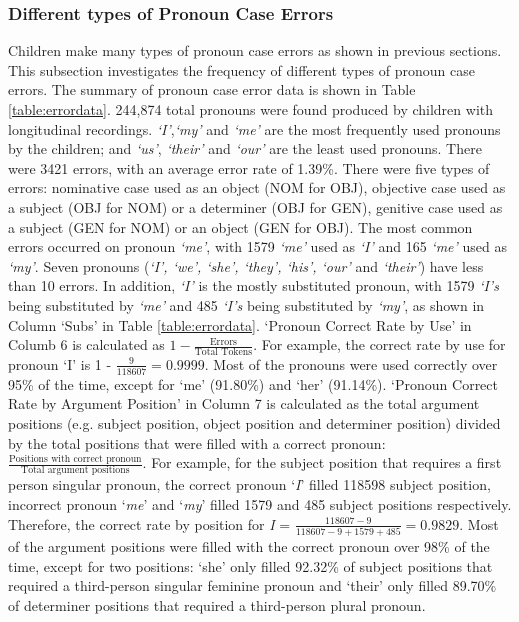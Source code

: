 \subsubsection{Different types of Pronoun Case Errors}
Children make many types of pronoun case errors as shown in previous sections. This subsection investigates the frequency of different types of pronoun case errors. The summary of pronoun case error data is shown in Table \ref{table:errordata}. 244,874 total pronouns were found produced by children with longitudinal recordings. \textit{`I'},\textit{`my'} and \textit{`me'} are the most frequently used pronouns by the children; and \textit{`us'}, \textit{`their'} and \textit{`our'} are the least used pronouns. There were 3421 errors, with an average error rate of 1.39\%. There were five types of errors: nominative case used as an object (NOM for OBJ), objective case used as a subject (OBJ for NOM) or a determiner (OBJ for GEN), genitive case used as a subject (GEN for NOM) or an object (GEN for OBJ). The most common errors occurred on pronoun \textit{`me'}, with 1579 \textit{`me'} used as \textit{`I'} and 165 \textit{`me'} used as \textit{`my'}. Seven pronouns (\textit{`I', `we', `she', `they', `his', `our'} and \textit{`their'}) have less than 10 errors. In addition, \textit{`I'} is the mostly substituted pronoun, with 1579 \textit{`I's} being substituted by \textit{`me'} and 485 \textit{`I's} being substituted by \textit{`my'}, as shown in Column `Subs' in Table \ref{table:errordata}. `Pronoun Correct Rate by Use' in Columb 6 is calculated as $1 - \displaystyle\frac{\text{Errors}}{\text{Total Tokens}}$.  For example, the correct rate by use for pronoun `I' is 1 -  $\displaystyle\frac{9}{118607} = 0.9999$. Most of the pronouns were used correctly over 95\% of the time, except for ‘me’ (91.80\%) and ‘her’ (91.14\%). `Pronoun Correct Rate by Argument Position' in Column 7 is calculated as the total argument positions (e.g. subject position, object position and determiner position) divided by the total positions that were  filled with a correct pronoun: $\displaystyle\frac{\text{Positions with correct pronoun}}{\text{Total argument positions}}$.  For example, for the subject position that requires a first person singular pronoun, the correct pronoun `\textit{I}' filled 118598 subject position, incorrect pronoun `\textit{me}' and `\textit{my}' filled 1579 and 485 subject positions respectively. Therefore, the correct rate by position for \textit{I} = $\displaystyle\frac{118607 - 9}{118607 - 9 + 1579 + 485} = 0.9829$. Most of the argument positions were filled with the correct pronoun over 98\% of the time, except for two positions: ‘she’ only filled 92.32\% of subject positions that required a third-person singular feminine pronoun and ‘their’ only filled 89.70\% of determiner positions that required a third-person plural pronoun. 

